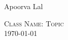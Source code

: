 \documentclass{amsart}
\begin{document}
\begin{flushright}
Apoorva Lal
\end{flushright}

\begin{center}
\textsc{Class Name: Topic} \\
\today
\end{center}
\end{document}
